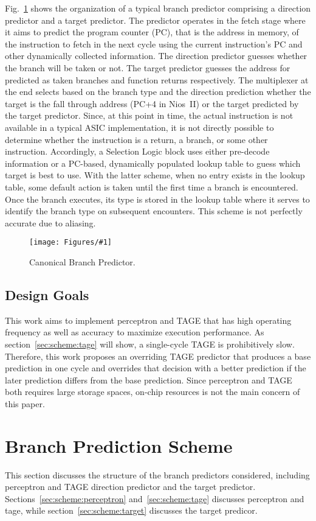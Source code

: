 \documentclass[conference]{IEEEtran}
\newcommand{\kfig}[4]{ %
        \begin{figure}[!t]
        \centering
        \texttt{[image: Figures/\#1]}
        \vspace{-1mm}
        \caption{#3}
        \label{#2}
        \end{figure}
}
\begin{document}
Fig.~\ref{fig:bpcanonical} shows the organization of a typical branch predictor comprising a direction predictor and a target predictor.  The predictor operates in the fetch stage where it aims to predict the program counter (PC), that is the address in memory, of the instruction to fetch in the next cycle using the current instruction's PC and other dynamically collected information. The direction predictor guesses whether the branch will be taken or not. The target predictor guesses the address for predicted as taken branches and function returns respectively. The multiplexer at the end selects based on the branch type and the direction prediction whether the target is the fall through address (PC+4 in Nios~II) or the target predicted by the target predictor. Since, at this point in time, the actual instruction is not available in a typical ASIC implementation, it is not directly possible to determine whether the instruction is a return, a branch, or some other instruction. Accordingly, a Selection Logic block uses either pre-decode information or a PC-based, dynamically populated lookup table to guess which target is best to use. With the latter scheme, when no entry exists in the lookup table, some default action is taken until the first time a branch is encountered. Once the branch executes, its type is stored in the lookup table where it serves to identify the branch type on subsequent encounters. This scheme is not perfectly accurate due to aliasing.
\kfig{bpcanonical.pdf}{fig:bpcanonical}{Canonical Branch Predictor.}{angle = 0, trim = 0.2in 1.7in 0.4in 0.1in, clip, width=0.4\textwidth}

\subsection{Design Goals}
\label{sec:background:goal}

This work aims to implement perceptron and TAGE that has high operating frequency as well as accuracy to maximize execution performance. As section~\ref{sec:scheme:tage} will show, a single-cycle TAGE is prohibitively slow. Therefore, this work proposes an overriding TAGE predictor that produces a base prediction in one cycle and overrides that decision with a better prediction if the later prediction differs from the base prediction. Since perceptron and TAGE both requires large storage spaces, on-chip resources is not the main concern of this paper.

\section{Branch Prediction Scheme}
\label{sec:scheme}
This section discusses the structure of the branch predictors considered, including perceptron and TAGE direction predictor and the target predictor. Sections~\ref{sec:scheme:perceptron} and~\ref{sec:scheme:tage} discusses perceptron and tage, while section~\ref{sec:scheme:target} discusses the target predicor.
\end{document}
